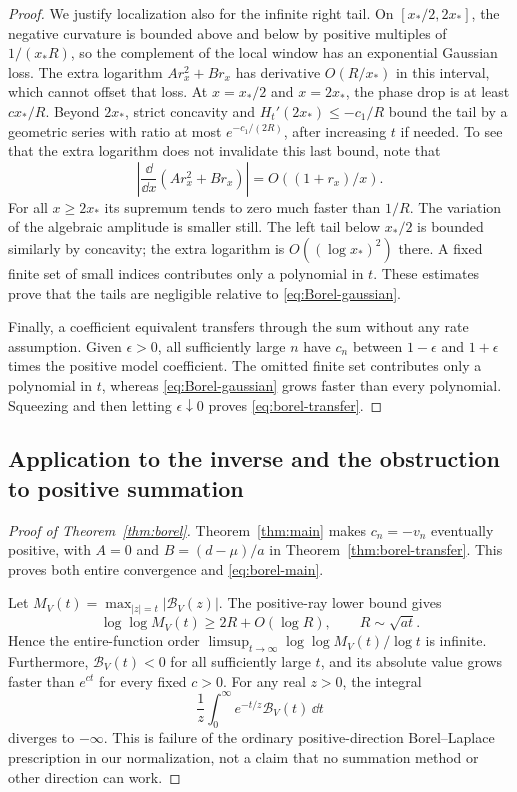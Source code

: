 \documentclass[11pt,a4paper]{article}
\numberwithin{equation}{section}
\theoremstyle{definition}
\theoremstyle{remark}
\newcommand{\Bcal}{\mathcal B}\newcommand{\Ccal}{\mathcal C}
\begin{document}
\begin{proof}
We justify localization also for the infinite right tail. On
$[x_*/2,2x_*]$, the negative curvature is bounded above and below by
positive multiples of $1/(x_*R)$, so the complement of the local window
has an exponential Gaussian loss. The extra logarithm $A r_x^2+B r_x$
has derivative $O(R/x_*)$ in this interval, which cannot offset that loss.
At $x=x_*/2$ and $x=2x_*$, the phase drop is at least $c x_*/R$.
Beyond $2x_*$, strict concavity and
$H_t'(2x_*)\le-c_1/R$ bound the tail by a geometric series with ratio at
most $e^{-c_1/(2R)}$, after increasing $t$ if needed. To see that the
extra logarithm does not invalidate this last bound, note that
\[
 \left|\frac{\dd}{\dd x}(A r_x^2+B r_x)\right|
       =O((1+r_x)/x).
\]
For all $x\ge2x_*$ its supremum tends to zero much faster than $1/R$.
The variation of the algebraic amplitude is smaller still. The left tail
below $x_*/2$ is bounded similarly by concavity; the extra logarithm is
$O((\log x_*)^2)$ there. A fixed finite set of small indices contributes
only a polynomial in $t$. These estimates prove that the tails are
negligible relative to \eqref{eq:Borel-gaussian}.

Finally, a coefficient equivalent transfers through the sum without any
rate assumption. Given $\epsilon>0$, all sufficiently large $n$ have
$c_n$ between $1-\epsilon$ and $1+\epsilon$ times the positive model
coefficient. The omitted finite set contributes only a polynomial in $t$,
whereas \eqref{eq:Borel-gaussian} grows faster than every polynomial.
Squeezing and then letting $\epsilon\downarrow0$ proves
\eqref{eq:borel-transfer}.
\end{proof}

\subsection{Application to the inverse and the obstruction to positive summation}

\begin{proof}[Proof of Theorem~\ref{thm:borel}]
Theorem~\ref{thm:main} makes $c_n=-v_n$ eventually positive, with
$A=0$ and $B=(d-\mu)/a$ in Theorem~\ref{thm:borel-transfer}.
This proves both entire convergence and \eqref{eq:borel-main}.

Let $M_V(t)=\max_{|z|=t}|\Bcal_V(z)|$. The positive-ray lower bound gives
\[
 \log\log M_V(t)\ge 2R+O(\log R),\qquad R\sim\sqrt{at}.
\]
Hence the entire-function order
$\limsup_{t\to\infty}\log\log M_V(t)/\log t$ is infinite.
Furthermore, $\Bcal_V(t)<0$ for all sufficiently large $t$, and its
absolute value grows faster than $e^{ct}$ for every fixed $c>0$.
For any real $z>0$, the integral
\begin{equation}
 \frac1z\int_0^\infty e^{-t/z}\Bcal_V(t)\,\dd t
 \label{eq:Laplace}
\end{equation}
diverges to $-\infty$. This is failure of the ordinary positive-direction
Borel--Laplace prescription in our normalization, not a claim that no
summation method or other direction can work.
\end{proof}
\end{document}

